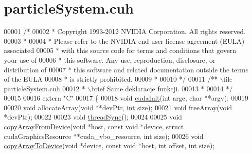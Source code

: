 \hypertarget{particle_system_8cuh_source}{\section{particle\-System.\-cuh}
}

\begin{DoxyCode}
00001 \textcolor{comment}{/*}
00002 \textcolor{comment}{ * Copyright 1993-2012 NVIDIA Corporation.  All rights reserved.}
00003 \textcolor{comment}{ *}
00004 \textcolor{comment}{ * Please refer to the NVIDIA end user license agreement (EULA) associated}
00005 \textcolor{comment}{ * with this source code for terms and conditions that govern your use of}
00006 \textcolor{comment}{ * this software. Any use, reproduction, disclosure, or distribution of}
00007 \textcolor{comment}{ * this software and related documentation outside the terms of the EULA}
00008 \textcolor{comment}{ * is strictly prohibited.}
00009 \textcolor{comment}{ *}
00010 \textcolor{comment}{ */}
00011  \textcolor{comment}{/** \(\backslash\)file particleSystem.cuh}
00012 \textcolor{comment}{  * \(\backslash\)brief Same deklaracje funkcji.}
00013 \textcolor{comment}{  *}
00014 \textcolor{comment}{  */}
00015 
00016 \textcolor{keyword}{extern} \textcolor{stringliteral}{"C"}
00017 \{
00018     \textcolor{keywordtype}{void} \hyperlink{particle_system_8cuh_ad205012a960928f6fb61ea4f51a95e9f}{cudaInit}(\textcolor{keywordtype}{int} argc, \textcolor{keywordtype}{char} **argv);
00019 
00020     \textcolor{keywordtype}{void} \hyperlink{particle_system_8cuh_aee51e01a5233e0fda578bd5b3bc38e8f}{allocateArray}(\textcolor{keywordtype}{void} **devPtr, \textcolor{keywordtype}{int} size);
00021     \textcolor{keywordtype}{void} \hyperlink{particle_system_8cuh_a2946519c8d9c4f8ebf552bf044821ea9}{freeArray}(\textcolor{keywordtype}{void} *devPtr);
00022 
00023     \textcolor{keywordtype}{void} \hyperlink{particle_system_8cuh_af59f4c114812beed29874c0a1a31519d}{threadSync}();
00024 
00025     \textcolor{keywordtype}{void} \hyperlink{particle_system_8cuh_a54716407dbd516db34f42b2faf7f91a3}{copyArrayFromDevice}(\textcolor{keywordtype}{void} *host, \textcolor{keyword}{const} \textcolor{keywordtype}{void} *device, \textcolor{keyword}{struct} 
      cudaGraphicsResource **cuda\_vbo\_resource, \textcolor{keywordtype}{int} size);
00026     \textcolor{keywordtype}{void} \hyperlink{particle_system_8cuh_ac4d4ecd921dbed6c2deef639ca295374}{copyArrayToDevice}(\textcolor{keywordtype}{void} *device, \textcolor{keyword}{const} \textcolor{keywordtype}{void} *host, \textcolor{keywordtype}{int} offset, \textcolor{keywordtype}{int} size);

\end{DoxyCode}
